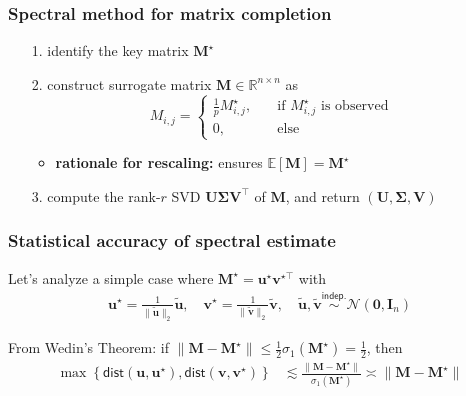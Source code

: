 \documentclass[compress,
mathserif,wide,%
]{beamer}
\begin{document}
\begin{frame}
\frametitle{Spectral method for matrix completion}

\begin{itemize}
	
	\item[{\color{black}1.}] identify the key matrix $\bm{M}^{\star}$
	\item[{\color{black}2.}] construct surrogate matrix ${\bm{M}}\in \mathbb{R}^{n\times n}$ as
	\[
		{M}_{i,j} = \begin{cases} \frac{1}{p} M_{i,j}^{\star}, \quad & \text{if }M_{i,j}^{\star}\text{ is observed} \\ 
					0,  & \text{else}	\end{cases} 
	\]
	\begin{itemize}
		\item {\bf rationale for rescaling:} ensures $\mathbb{E}[{\bm{M}}] = \bm{M}^{\star}$
	\end{itemize}

	\bigskip

\item[{\color{black}3.}] compute the rank-$r$ SVD ${\bm{U}}{\bm{\Sigma}}{\bm{V}}^{\top}$ of ${\bm{M}}$, and return $({\bm{U}}, {\bm{\Sigma}}, {\bm{V}})$

	
\end{itemize}


\end{frame}


\begin{frame}
\frametitle{Statistical accuracy of spectral estimate}

Let's analyze a simple case where $\bm{M}^{\star}=\bm{u}^\star \bm{v}^{\star\top}$ with
%
\begin{align*}
	\bm{u}^\star = \frac{1}{\|\tilde{\bm{u}}\|_2} \tilde{\bm{u}}, \quad \bm{v}^\star = \frac{1}{\|\tilde{\bm{v}}\|_2} \tilde{\bm{v}}, \quad \tilde{\bm{u}}, \tilde{\bm{v}} \overset{\mathsf{indep.}}{\sim} \mathcal{N}(\bm{0},\bm{I}_n)
\end{align*}
%

\vfill

From Wedin's Theorem: if $\|\bm{M} - \bm{M}^\star\| \leq \frac{1}{2} \sigma_{1}(\bm{M}^{\star}) = \frac{1}{2}$, then
%
\begin{align}
	\max\left\{ \mathsf{dist}({\bm{u}},\bm{u}^{\star} ),\mathsf{dist}( {\bm{v}},\bm{v}^{\star} )\right\} 
	& \lesssim \frac{ \| {\bm{M}} - \bm{M}^\star \|  }{\sigma_1(\bm{M}^\star)} \asymp \|\bm{M} - \bm{M}^\star\|
\end{align}
%


\end{frame}
\end{document}
